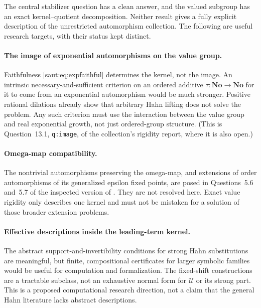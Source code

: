 \documentclass[11pt]{article}
\theoremstyle{definition}
\theoremstyle{remark}
\newcommand{\No}{\mathbf{No}}
\newcommand{\U}{\mathcal U}
\newcommand{\lbl}[1]{\nolinkurl{#1}}%
\numberwithin{equation}{section}
\begin{document}
The central stabilizer question has a clean answer, and the valued subgroup
has an exact kernel--quotient decomposition. Neither result gives a fully
explicit description of the unrestricted automorphism collection.
The following are useful research targets, with their status kept distinct.

\paragraph{The image of exponential automorphisms on the value group.}
Faithfulness \eqref{saut:eq:expfaithful} determines the kernel, not the image.
An intrinsic necessary-and-sufficient criterion on an ordered additive
$\tau:\No\to\No$ for it to come from an exponential automorphism would
be much stronger. Positive rational dilations already show that arbitrary
Hahn lifting does not solve the problem. Any such criterion must use the
interaction between the value group and real exponential growth, not just
ordered-group structure. (This is Question~13.1, \lbl{q:image}, of the
collection's rigidity report, where it is also open.)

\paragraph{Omega-map compatibility.}
The nontrivial automorphisms preserving the omega-map, and extensions of
order automorphisms of its generalized epsilon fixed points, are posed in
Questions~5.6 and~5.7 of the inspected version of \cite{KKS}. They are not
resolved here. Exact value rigidity only describes one kernel and must not
be mistaken for a solution of those broader extension problems.

\paragraph{Effective descriptions inside the leading-term kernel.}
The abstract support-and-invertibility conditions for strong Hahn
substitutions are meaningful, but finite, compositional certificates for
larger symbolic families would be useful for computation and formalization.
The fixed-shift constructions are a tractable subclass, not an exhaustive
normal form for $\U$ or its strong part. This is a proposed computational
research direction, not a claim that the general Hahn literature lacks
abstract descriptions.
\end{document}
